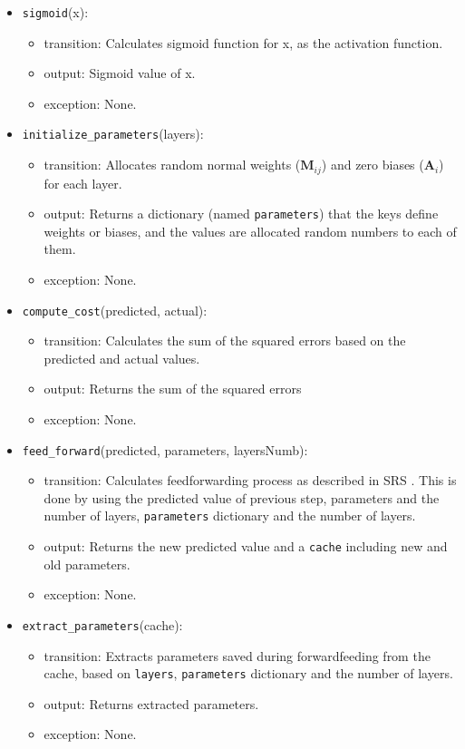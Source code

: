 \documentclass[12pt, titlepage]{article}
\def\code#1{\texttt{#1}}
\begin{document}
\begin{itemize}
  \item \code{sigmoid}(x):
  \begin{itemize}
    \item transition: Calculates sigmoid function for x, as the activation function.
    \item output: Sigmoid value of x. 
    \item exception: None.
  \end{itemize}

  \item \code{initialize\_parameters}(layers):
  \begin{itemize}
    \item transition: Allocates random normal weights ($\mathbf{M}_{ij}$) 
    and zero biases ($\mathbf{A}_{i}$) for each layer.
    \item output: Returns a dictionary (named \code{parameters}) 
    that the keys define weights or biases, and the values are allocated random numbers 
    to each of them.
    \item exception: None.
  \end{itemize}

  \item \code{compute\_cost}(predicted, actual):
  \begin{itemize}
    \item transition: Calculates the sum of the squared errors based on the 
    predicted and actual values.
    \item output: Returns the sum of the squared errors
    \item exception: None.
  \end{itemize}

  \item \code{feed\_forward}(predicted, parameters, layersNumb):
  \begin{itemize}
    \item transition: Calculates feedforwarding process as described in SRS \cite{SRS}. 
    This is done by using the predicted value of previous step, parameters and the number of layers, 
    \code{parameters} dictionary and the number of layers.
    \item output: Returns the new predicted value and a \code{cache} including new and old parameters.
    \item exception: None.
  \end{itemize}

  \item \code{extract\_parameters}(cache):
  \begin{itemize}
    \item transition: Extracts parameters saved during forwardfeeding from the cache, based on \code{layers},
    \code{parameters} dictionary and the number of layers.
    \item output: Returns extracted parameters.
    \item exception: None.
  \end{itemize}


\end{itemize}
\end{document}
